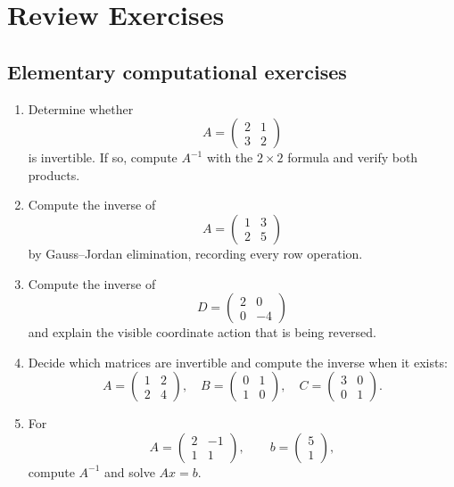 \section{Review Exercises}

\subsection{Elementary computational exercises}

\begin{enumerate}
\item Determine whether
\[
A=\begin{pmatrix}2&1\\3&2\end{pmatrix}
\]
is invertible. If so, compute $A^{-1}$ with the $2\times2$ formula and verify both products.

\item Compute the inverse of
\[
A=\begin{pmatrix}1&3\\2&5\end{pmatrix}
\]
by Gauss--Jordan elimination, recording every row operation.

\item Compute the inverse of
\[
D=\begin{pmatrix}2&0\\0&-4\end{pmatrix}
\]
and explain the visible coordinate action that is being reversed.

\item Decide which matrices are invertible and compute the inverse when it exists:
\[
A=\begin{pmatrix}1&2\\2&4\end{pmatrix},
\quad
B=\begin{pmatrix}0&1\\1&0\end{pmatrix},
\quad
C=\begin{pmatrix}3&0\\0&1\end{pmatrix}.
\]

\item For
\[
A=\begin{pmatrix}2&-1\\1&1\end{pmatrix},
\qquad
b=\begin{pmatrix}5\\1\end{pmatrix},
\]
compute $A^{-1}$ and solve $Ax=b$.


\end{enumerate}
